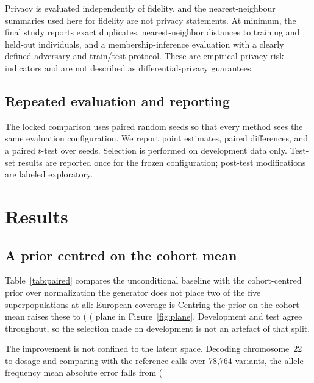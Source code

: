 \documentclass[11pt,a4paper]{article}
\begin{document}
Privacy is evaluated independently of fidelity, and the nearest-neighbour
summaries used here for fidelity are not privacy statements. At minimum, the
final study reports exact duplicates, nearest-neighbor distances to training and
held-out individuals, and a membership-inference evaluation with a clearly
defined adversary and train/test protocol. These are empirical privacy-risk
indicators and are not described as differential-privacy guarantees.

\subsection{Repeated evaluation and reporting}
\label{sec:reporting}

The locked comparison uses paired random seeds so that every method sees the
same evaluation configuration. We report point estimates, paired differences,
and a paired $t$-test over seeds. Selection is performed on development data
only. Test-set results are reported once for the frozen configuration;
post-test modifications are labeled exploratory.

\section{Results}
\label{sec:results}

\subsection{A prior centred on the cohort mean}
\label{sec:res-prior}

Table~\ref{tab:paired} compares the unconditional baseline with the
cohort-centred prior over %
normalization the generator does not place two of the five superpopulations at
all: European coverage is %
Centring the prior on the cohort mean raises these to %
(%
(%
plane in Figure~\ref{fig:plane}. Development and test agree throughout, so the
selection made on development is not an artefact of that split.

The improvement is not confined to the latent space. Decoding chromosome~22 to
dosage and comparing with the reference calls over 78,764 variants, the
allele-frequency mean absolute error falls from %
(%
\end{document}
